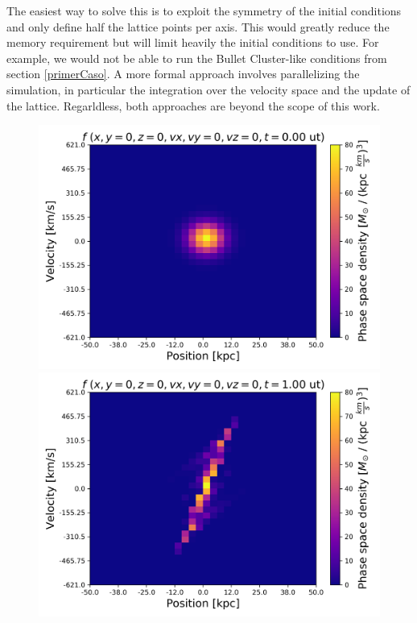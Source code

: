 {The easiest way to solve this is to exploit the symmetry of the initial conditions and only define half the lattice points per axis. This would greatly reduce the memory requirement but will limit heavily the initial conditions to use. For example, we would not be able to run the Bullet Cluster-like conditions from section \ref{primerCaso}. A more formal approach involves parallelizing the simulation, in particular the integration over the velocity space and the update of the lattice. Regarldless, both approaches are beyond the scope of this work.




\begin{figure}[h!]
    \centering
    \includegraphics[scale=0.4]{imag/3dPhase0.png}
    \includegraphics[scale=0.4]{imag/3dPhase2.png}

\end{figure}}
